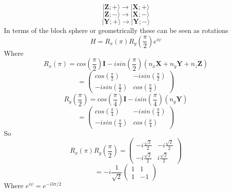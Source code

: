 \documentclass[12pt]{article}
\newcommand{\ket}[1]{\vert{#1}\rangle}
\begin{document}
\begin{enumerate}
    $$ \ket{\textbf{Z}; +} \rightarrow \ket{\textbf{X}; +} $$
    $$ \ket{\textbf{Z}; -} \rightarrow \ket{\textbf{X}; -} $$
    $$ \ket{\textbf{Y}; +} \rightarrow \ket{\textbf{Y}; -} $$
    In terms of the bloch sphere or geometrically these can be seen as rotations
    $$ H = R_x (\pi) R_y(\frac{\pi}{2}) e^{i \psi} $$
    Where 
    $$ R_x (\pi) = cos(\frac{\pi}{2})\textbf{I} - isin(\frac{\pi}{2})(n_x \textbf{X} + n_y \textbf{Y} + n_z \textbf{Z}) $$
    $$ = \left(\begin{array}{cc} cos(\frac{\pi}{2}) & -isin(\frac{\pi}{2}) \\  -isin(\frac{\pi}{2}) & cos(\frac{\pi}{2})\end{array}\right) $$
    $$ R_y(\frac{\pi}{2}) = cos(\frac{\pi}{4}) \textbf{I} - isin(\frac{\pi}{4})(n_y \textbf{Y}) $$
    $$ = \left(\begin{array}{cc} cos(\frac{\pi}{4}) & -isin(\frac{\pi}{4}) \\  -isin(\frac{\pi}{4}) & cos(\frac{\pi}{4})\end{array}\right) $$
    So 
    $$ R_x (\pi) R_y (\frac{\pi}{2}) = \left(\begin{array}{cc} -i \frac{\sqrt{2}}{2} & -i \frac{\sqrt{2}}{2} \\  -i \frac{\sqrt{2}}{2} & i \frac{\sqrt{2}}{2}\end{array}\right) $$
    $$ = -i \frac{1}{\sqrt{2}} \left(\begin{array}{cc} 1 & 1 \\  1 & -1\end{array}\right) $$
    Where $e^{i \psi} = e^{-i 3 \pi /2} $



\end{enumerate}
\end{document}
